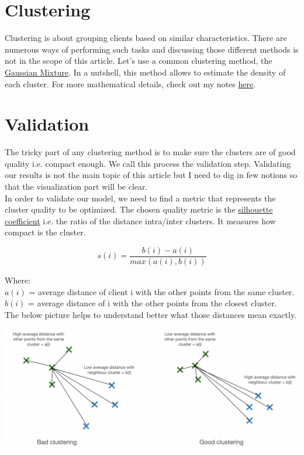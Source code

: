 \section{Clustering}

Clustering is about grouping clients based on similar characteristics. There are numerous ways of performing such tasks and discussing those different methods is not in the scope of this article. Let's use a common clustering method, the \href{https://en.wikipedia.org/wiki/Mixture_model}{Gaussian Mixture}. In a nutshell, this method allows to estimate the density of each cluster. For more mathematical details, check out my notes \href{https://savoga.github.io/machinelearning/gmm/}{here}.

\section{Validation}

The tricky part of any clustering method is to make sure the clusters are of good quality i.e. compact enough. We call this process the validation step. Validating our results is not the main topic of this article but I need to dig in few notions so that the visualization part will be clear. \\
In order to validate our model, we need to find a metric that represents the cluster quality to be optimized.
The chosen quality metric is the \href{https://en.wikipedia.org/wiki/Silhouette_(clustering)}{silhouette coefficient} i.e. the ratio of the distance intra/inter clusters. It measures how compact is the cluster. 

$$s(i) = \frac{b(i)-a(i)}{max(a(i),b(i))}$$

Where: \\
$a(i)$ = average distance of client i with the other points from the same cluster. \\
$b(i)$ = average distance of i with the other points from the closest cluster. \\

The below picture helps to understand better what those distances mean exactly. 

\begin{center}
\includegraphics[scale=0.5]{./../img/silhouette-explanations.png}
\end{center}

